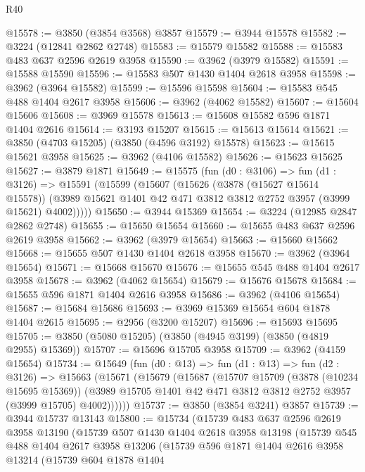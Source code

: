 \begin{lexlean}{R40}
\begin{coremodule}
@15578 := @3850 (@3854 @3568) @3857
@15579 := @3944 @15578
@15582 := @3224 (@12841 @2862 @2748)
@15583 := @15579 @15582
@15588 := @15583 @483 @637 @2596 @2619 @3958
@15590 := @3962 (@3979 @15582)
@15591 := @15588 @15590
@15596 := @15583 @507 @1430 @1404 @2618 @3958
@15598 := @3962 (@3964 @15582)
@15599 := @15596 @15598
@15604 := @15583 @545 @488 @1404 @2617 @3958
@15606 := @3962 (@4062 @15582)
@15607 := @15604 @15606
@15608 := @3969 @15578
@15613 := @15608 @15582 @596 @1871 @1404 @2616
@15614 := @3193 @15207
@15615 := @15613 @15614
@15621 := @3850 (@4703 @15205) (@3850 (@4596 @3192) @15578)
@15623 := @15615 @15621 @3958
@15625 := @3962 (@4106 @15582)
@15626 := @15623 @15625
@15627 := @3879 @1871
@15649 := @15575
    (fun (d0 : @3106) =>
    fun (d1 : @3126) =>
    @15591
      (@15599
        (@15607
          (@15626
            (@3878 (@15627 @15614 @15578))
            (@3989 @15621 @1401 @42 @471 @3812 @3812 @2752 @3957 (@3999 @15621) @4002)))))
@15650 := @3944 @15369
@15654 := @3224 (@12985 @2847 @2862 @2748)
@15655 := @15650 @15654
@15660 := @15655 @483 @637 @2596 @2619 @3958
@15662 := @3962 (@3979 @15654)
@15663 := @15660 @15662
@15668 := @15655 @507 @1430 @1404 @2618 @3958
@15670 := @3962 (@3964 @15654)
@15671 := @15668 @15670
@15676 := @15655 @545 @488 @1404 @2617 @3958
@15678 := @3962 (@4062 @15654)
@15679 := @15676 @15678
@15684 := @15655 @596 @1871 @1404 @2616 @3958
@15686 := @3962 (@4106 @15654)
@15687 := @15684 @15686
@15693 := @3969 @15369 @15654 @604 @1878 @1404 @2615
@15695 := @2956 (@3200 @15207)
@15696 := @15693 @15695
@15705 := @3850 (@5080 @15205) (@3850 (@4945 @3199) (@3850 (@4819 @2955) @15369))
@15707 := @15696 @15705 @3958
@15709 := @3962 (@4159 @15654)
@15734 := @15649
    (fun (d0 : @13) =>
    fun (d1 : @13) =>
    fun (d2 : @3126) =>
    @15663
      (@15671
        (@15679
          (@15687
            (@15707
              @15709
              (@3878 (@10234 @15695 @15369))
              (@3989 @15705 @1401 @42 @471 @3812 @3812 @2752 @3957 (@3999 @15705) @4002))))))
@15737 := @3850 (@3854 @3241) @3857
@15739 := @3944 @15737 @13143
@15800 := @15734
    (@15739
      @483
      @637
      @2596
      @2619
      @3958
      @13190
      (@15739
        @507
        @1430
        @1404
        @2618
        @3958
        @13198
        (@15739
          @545
          @488
          @1404
          @2617
          @3958
          @13206
          (@15739
            @596
            @1871
            @1404
            @2616
            @3958
            @13214
            (@15739
              @604
              @1878
              @1404

\end{coremodule}
\end{lexlean}
